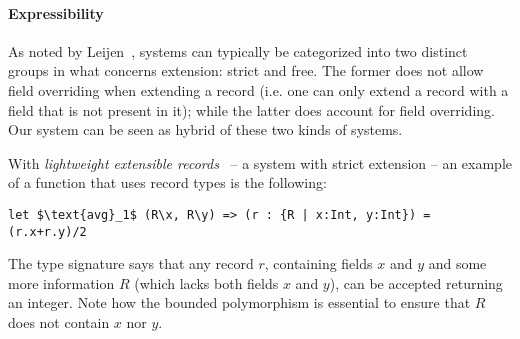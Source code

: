 \begin{comment}
\begin{lstlisting}[mathescape=true]
let $\text{addL}_3$ (A * { l : $\bot$ }) (x : A) : A & { l : $\bot$ } = $\ldots$ in $\ldots$ 
\end{lstlisting}
Unfortunately, our system does not support the $\bot$ type, so this program would not be accepted.
We will get into the reasons for this in further detail, in Section~\ref{sec:conclusion}.
\end{comment}


\paragraph{Expressibility}
As noted by Leijen~\cite{leijen2005extensible}, systems can typically be
categorized into two distinct groups in what concerns extension:
strict and free. The former does not allow field overriding when
extending a record (i.e. one can only extend a record with a field
that is not present in it); while the latter does account for field
overriding.  Our system can be seen as hybrid of these two kinds of
systems.  

With \emph{lightweight extensible records}~\cite{jones99lightweight} -- a system with strict extension -- an example of a function that uses 
record types is the following:
\begin{lstlisting}[mathescape=true]
let $\text{avg}_1$ (R\x, R\y) => (r : {R | x:Int, y:Int}) = (r.x+r.y)/2
\end{lstlisting}
The type signature says that any record $r$, containing fields $x$
and $y$ and some more information $R$ (which lacks both fields $x$ and
$y$), can be accepted returning an integer.  Note how the bounded
polymorphism is essential to ensure that $R$ does not contain $x$ nor
$y$.

